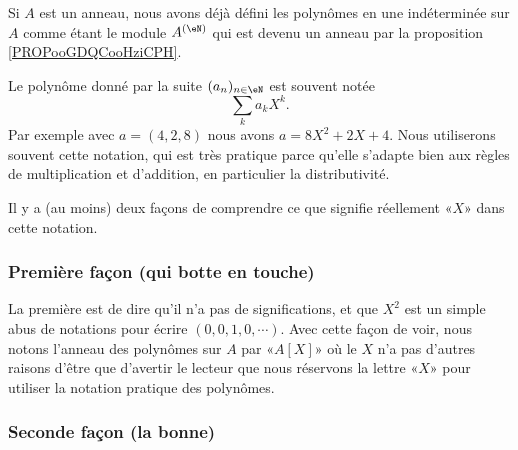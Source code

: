 Si \( A\) est un anneau, nous avons déjà défini les polynômes en une indéterminée sur \( A\) comme étant le module \( A^{(\eN)}\) qui est devenu un anneau par la proposition \ref{PROPooGDQCooHziCPH}.

Le polynôme donné par la suite \( (a_n)_{n\in \eN}\) est souvent notée
\begin{equation}
    \sum_ka_kX^k.
\end{equation}
Par exemple avec \( a=(4,2,8)\) nous avons \( a=8X^2+2X+4\). Nous utiliserons souvent cette notation, qui est très pratique parce qu'elle s'adapte bien aux règles de multiplication et d'addition, en particulier la distributivité.

Il y a (au moins) deux façons de comprendre ce que signifie réellement «\( X\)» dans cette notation.

\subsubsection{Première façon (qui botte en touche)}

La première est de dire qu'il n'a pas de significations, et que \( X^2\) est un simple abus de notations pour écrire \( (0,0,1,0,\cdots)\). Avec cette façon de voir, nous notons l'anneau des polynômes sur \( A\) par «\( A[X]\)» où le \( X\) n'a pas d'autres raisons d'être que d'avertir le lecteur que nous réservons la lettre «\( X\)» pour utiliser la notation pratique des polynômes.

\subsubsection{Seconde façon (la bonne)}
\label{SUBSUBSECooPNBYooWXEHrg}

